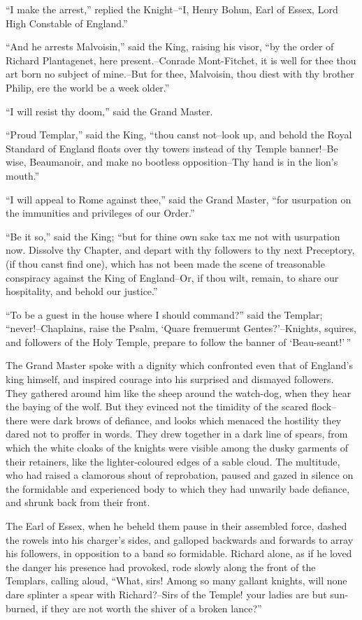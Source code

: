 ``I make the arrest,'' replied the Knight--``I, Henry Bohun, Earl of
Essex, Lord High Constable of England.''

``And he arrests Malvoisin,'' said the King, raising his visor, ``by the
order of Richard Plantagenet, here present.--Conrade Mont-Fitchet, it is
well for thee thou art born no subject of mine.--But for thee,
Malvoisin, thou diest with thy brother Philip, ere the world be a week
older.''

``I will resist thy doom,'' said the Grand Master.

``Proud Templar,'' said the King, ``thou canst not--look up, and behold
the Royal Standard of England floats over thy towers instead of thy
Temple banner!--Be wise, Beaumanoir, and make no bootless
opposition--Thy hand is in the lion's mouth.''

``I will appeal to Rome against thee,'' said the Grand Master, ``for
usurpation on the immunities and privileges of our Order.''

``Be it so,'' said the King; ``but for thine own sake tax me not with
usurpation now. Dissolve thy Chapter, and depart with thy followers to
thy next Preceptory, (if thou canst find one), which has not been made
the scene of treasonable conspiracy against the King of England--Or, if
thou wilt, remain, to share our hospitality, and behold our justice.''

``To be a guest in the house where I should command?'' said the Templar;
``never!--Chaplains, raise the Psalm, `Quare fremuerunt
Gentes?'--Knights, squires, and followers of the Holy Temple, prepare to
follow the banner of `Beau-seant!'\,''

The Grand Master spoke with a dignity which confronted even that of
England's king himself, and inspired courage into his surprised and
dismayed followers. They gathered around him like the sheep around the
watch-dog, when they hear the baying of the wolf. But they evinced not
the timidity of the scared flock--there were dark brows of defiance, and
looks which menaced the hostility they dared not to proffer in words.
They drew together in a dark line of spears, from which the white cloaks
of the knights were visible among the dusky garments of their retainers,
like the lighter-coloured edges of a sable cloud. The multitude, who had
raised a clamorous shout of reprobation, paused and gazed in silence on
the formidable and experienced body to which they had unwarily bade
defiance, and shrunk back from their front.

The Earl of Essex, when he beheld them pause in their assembled force,
dashed the rowels into his charger's sides, and galloped backwards and
forwards to array his followers, in opposition to a band so formidable.
Richard alone, as if he loved the danger his presence had provoked, rode
slowly along the front of the Templars, calling aloud, ``What, sirs!
Among so many gallant knights, will none dare splinter a spear with
Richard?--Sirs of the Temple! your ladies are but sun-burned, if they
are not worth the shiver of a broken lance?''


